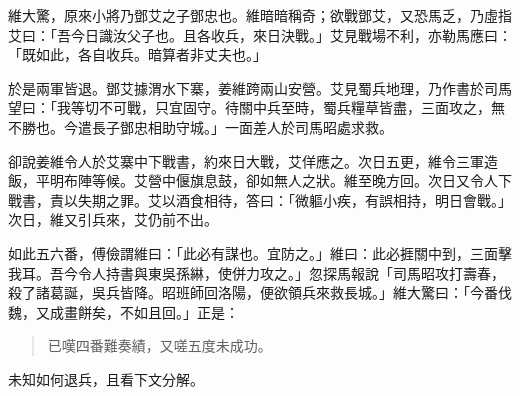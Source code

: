 維大驚，原來小將乃鄧艾之子鄧忠也。維暗暗稱奇；欲戰鄧艾，又恐馬乏，乃虛指艾曰：「吾今日識汝父子也。且各收兵，來日決戰。」艾見戰場不利，亦勒馬應曰：「既如此，各自收兵。暗算者非丈夫也。」

於是兩軍皆退。鄧艾據渭水下寨，姜維跨兩山安營。艾見蜀兵地理，乃作書於司馬望曰：「我等切不可戰，只宜固守。待關中兵至時，蜀兵糧草皆盡，三面攻之，無不勝也。今遣長子鄧忠相助守城。」一面差人於司馬昭處求救。

卻說姜維令人於艾寨中下戰書，約來日大戰，艾佯應之。次日五更，維令三軍造飯，平明布陣等候。艾營中偃旗息鼓，卻如無人之狀。維至晚方回。次日又令人下戰書，責以失期之罪。艾以酒食相待，答曰：「微軀小疾，有誤相持，明日會戰。」次日，維又引兵來，艾仍前不出。

如此五六番，傅儉謂維曰：「此必有謀也。宜防之。」維曰：此必捱關中到，三面擊我耳。吾今令人持書與東吳孫綝，使併力攻之。」忽探馬報說「司馬昭攻打壽春，殺了諸葛誕，吳兵皆降。昭班師回洛陽，便欲領兵來救長城。」維大驚曰：「今番伐魏，又成畫餅矣，不如且回。」正是：

\begin{quote}
已嘆四番難奏績，又嗟五度未成功。
\end{quote}

未知如何退兵，且看下文分解。

